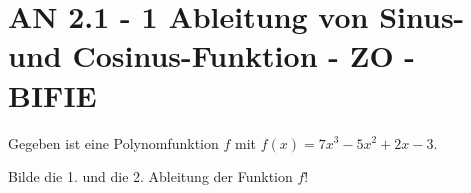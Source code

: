 \section{AN 2.1 - 1 Ableitung von Sinus- und Cosinus-Funktion - ZO - BIFIE}

\begin{beispiel}[AN 2.1]{1} %
				Gegeben ist eine Polynomfunktion $f$ mit $f(x)=7x^3-5x^2+2x-3$.

Bilde die 1. und die 2. Ableitung der Funktion $f$!
\leer

\end{beispiel}